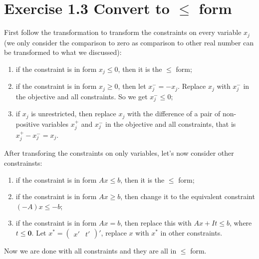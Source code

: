 \section{Exercise 1.3 Convert to $\leq$ form}

First follow the transformation to transform the constraints on every variable $x_j$ (we only consider the comparison to zero as comparison to other real number can be transformed to what we discussed):

\begin{enumerate}
\item if the constraint is in form $x_j \leq 0 $, then it is the $\leq$ form;
\item if the constraint is in form $x_j \geq 0 $, then let $x_j^- = - x_j$. Replace $x_j$ with $x_j^-$ in the objective and all constraints. So we get $x_j^- \leq 0$;
\item if $x_j$ is unrestricted, then replace $x_j$ with the difference of a pair of non-positive variables $x_j^+$ and $x_j^-$ in the objective and all constraints, that is $x_j^+-x_j^- = x_j$.
\end{enumerate}

After transforing the constraints on only variables, let's now consider other constrainsts:

\begin{enumerate}
\item if the constraint is in form $Ax \leq b$, then it is the $\leq$ form;
\item if the constraint is in form $Ax \geq b$, then change it to the equivalent constraint $(-A)x \leq -b$;
\item if the constraint is in form $Ax = b$, then replace this with $Ax + It \leq b $, where $t \leq \mathbf{0}$. Let $x^* = \left(
\begin{array}{cc}
 x' & t' 
\end{array}
\right)'$, replace $x$ with $x^*$ in other constraints.
\end{enumerate}

Now we are done with all constraints and they are all in $\leq$ form.